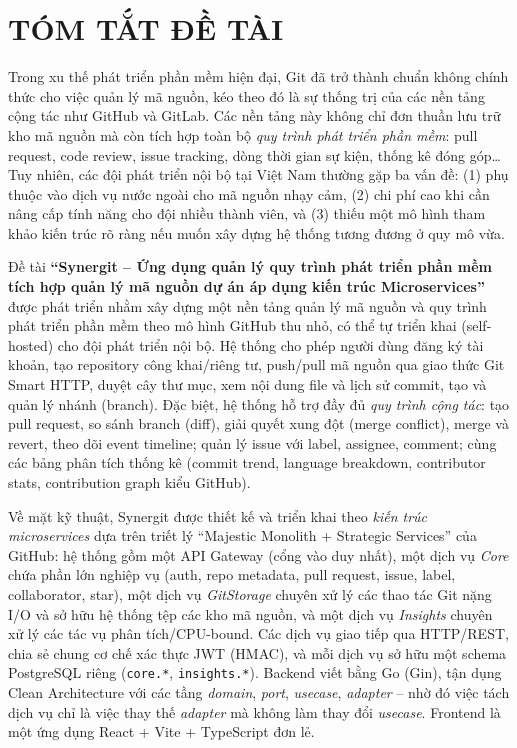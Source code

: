 \chapter*{TÓM TẮT ĐỀ TÀI}

\hspace{1.2em}Trong xu thế phát triển phần mềm hiện đại, Git đã trở thành chuẩn không chính thức cho việc quản lý mã nguồn, kéo theo đó là sự thống trị của các nền tảng cộng tác như GitHub và GitLab. Các nền tảng này không chỉ đơn thuần lưu trữ kho mã nguồn mà còn tích hợp toàn bộ \textit{quy trình phát triển phần mềm}: pull request, code review, issue tracking, dòng thời gian sự kiện, thống kê đóng góp\ldots Tuy nhiên, các đội phát triển nội bộ tại Việt Nam thường gặp ba vấn đề: (1) phụ thuộc vào dịch vụ nước ngoài cho mã nguồn nhạy cảm, (2) chi phí cao khi cần nâng cấp tính năng cho đội nhiều thành viên, và (3) thiếu một mô hình tham khảo kiến trúc rõ ràng nếu muốn xây dựng hệ thống tương đương ở quy mô vừa.

\hspace{1.2em}Đề tài \textbf{``Synergit -- Ứng dụng quản lý quy trình phát triển phần mềm tích hợp quản lý mã nguồn dự án áp dụng kiến trúc Microservices''} được phát triển nhằm xây dựng một nền tảng quản lý mã nguồn và quy trình phát triển phần mềm theo mô hình GitHub thu nhỏ, có thể tự triển khai (self-hosted) cho đội phát triển nội bộ. Hệ thống cho phép người dùng đăng ký tài khoản, tạo repository công khai/riêng tư, push/pull mã nguồn qua giao thức Git Smart HTTP, duyệt cây thư mục, xem nội dung file và lịch sử commit, tạo và quản lý nhánh (branch). Đặc biệt, hệ thống hỗ trợ đầy đủ \textit{quy trình cộng tác}: tạo pull request, so sánh branch (diff), giải quyết xung đột (merge conflict), merge và revert, theo dõi event timeline; quản lý issue với label, assignee, comment; cùng các bảng phân tích thống kê (commit trend, language breakdown, contributor stats, contribution graph kiểu GitHub).

\hspace{1.2em}Về mặt kỹ thuật, Synergit được thiết kế và triển khai theo \textit{kiến trúc microservices} dựa trên triết lý ``Majestic Monolith + Strategic Services'' của GitHub: hệ thống gồm một API Gateway (cổng vào duy nhất), một dịch vụ \textit{Core} chứa phần lớn nghiệp vụ (auth, repo metadata, pull request, issue, label, collaborator, star), một dịch vụ \textit{GitStorage} chuyên xử lý các thao tác Git nặng I/O và sở hữu hệ thống tệp các kho mã nguồn, và một dịch vụ \textit{Insights} chuyên xử lý các tác vụ phân tích/CPU-bound. Các dịch vụ giao tiếp qua HTTP/REST, chia sẻ chung cơ chế xác thực JWT (HMAC), và mỗi dịch vụ sở hữu một schema PostgreSQL riêng (\texttt{core.*}, \texttt{insights.*}). Backend viết bằng Go (Gin), tận dụng Clean Architecture với các tầng \textit{domain}, \textit{port}, \textit{usecase}, \textit{adapter} -- nhờ đó việc tách dịch vụ chỉ là việc thay thế \textit{adapter} mà không làm thay đổi \textit{usecase}. Frontend là một ứng dụng React + Vite + TypeScript đơn lẻ.

